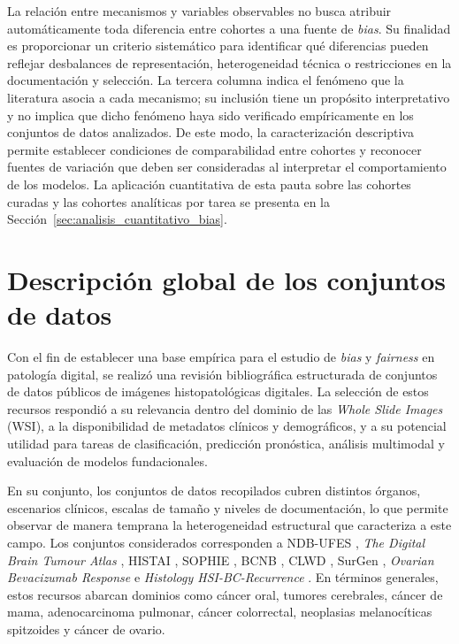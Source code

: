 La relación entre mecanismos y variables observables no busca atribuir automáticamente toda diferencia entre cohortes a una fuente de \textit{bias}. Su finalidad es proporcionar un criterio sistemático para identificar qué diferencias pueden reflejar desbalances de representación, heterogeneidad técnica o restricciones en la documentación y selección. La tercera columna indica el fenómeno que la literatura asocia a cada mecanismo; su inclusión tiene un propósito interpretativo y no implica que dicho fenómeno haya sido verificado empíricamente en los conjuntos de datos analizados. De este modo, la caracterización descriptiva permite establecer condiciones de comparabilidad entre cohortes y reconocer fuentes de variación que deben ser consideradas al interpretar el comportamiento de los modelos. La aplicación cuantitativa de esta pauta sobre las cohortes curadas y las cohortes analíticas por tarea se presenta en la Sección~\ref{sec:analisis_cuantitativo_bias}.

\section{Descripción global de los conjuntos de datos}

Con el fin de establecer una base empírica para el estudio de \textit{bias} y \textit{fairness} en patología digital, se realizó una revisión bibliográfica estructurada de conjuntos de datos públicos de imágenes histopatológicas digitales. La selección de estos recursos respondió a su relevancia dentro del dominio de las \textit{Whole Slide Images} (WSI), a la disponibilidad de metadatos clínicos y demográficos, y a su potencial utilidad para tareas de clasificación, predicción pronóstica, análisis multimodal y evaluación de modelos fundacionales.

En su conjunto, los conjuntos de datos recopilados cubren distintos órganos, escenarios clínicos, escalas de tamaño y niveles de documentación, lo que permite observar de manera temprana la heterogeneidad estructural que caracteriza a este campo. Los conjuntos considerados corresponden a NDB-UFES \parencite{NDBUFES2023}, \textit{The Digital Brain Tumour Atlas} \parencite{DigitalBrainTumourAtlas2022}, HISTAI \parencite{HISTAI2025}, SOPHIE \parencite{SOPHIE2023}, BCNB \parencite{BCNB2021}, CLWD \parencite{CLWD2026}, SurGen \parencite{SurGen2026}, \textit{Ovarian Bevacizumab Response} \parencite{OvarianBevacizumab2022} e \textit{Histology HSI-BC-Recurrence} \parencite{HistologyHSIBCRecurrence2025}. En términos generales, estos recursos abarcan dominios como cáncer oral, tumores cerebrales, cáncer de mama, adenocarcinoma pulmonar, cáncer colorrectal, neoplasias melanocíticas spitzoides y cáncer de ovario.

